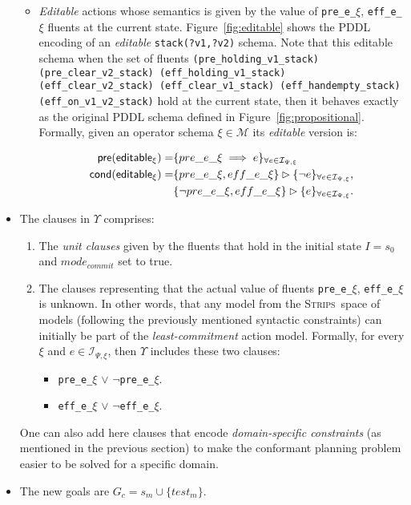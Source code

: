 \documentclass{article}
\newcommand{\pre}{\mathsf{pre}}     %
\newcommand{\cond}{\mathsf{cond}}   %
\newcommand{\strips}{\textsc{Strips}}
\begin{document}
\begin{itemize}
\begin{itemize}
      \item {\em Editable} actions whose semantics is given by the value of {\tt\small pre\_e\_$\xi$}, {\tt\small eff\_e\_$\xi$} fluents at the current state. Figure~\ref{fig:editable} shows the PDDL encoding of an {\em editable} {\tt\small stack(?v1,?v2)} schema. Note that this editable schema when the set of fluents {\tiny\tt (pre\_holding\_v1\_stack) (pre\_clear\_v2\_stack) (eff\_holding\_v1\_stack) (eff\_clear\_v2\_stack) (eff\_clear\_v1\_stack) (eff\_handempty\_stack) (eff\_on\_v1\_v2\_stack)} hold at the current state, then it behaves exactly as the original PDDL schema defined in Figure~\ref{fig:propositional}. Formally, given an operator schema $\xi\in\mathcal{M}$ its {\em editable} version is:
\begin{small}  
\begin{align*}
\hspace*{7pt}\pre(\mathsf{editable_{\xi}})=&\{pre\_e\_\xi\implies e\}_{\forall e\in{\mathcal I}_{\Psi,\xi}}\\
\cond(\mathsf{editable_{\xi}})=&\{pre\_e\_\xi, eff\_e\_\xi\}\rhd\{\neg e\}_{\forall e\in{\mathcal I}_{\Psi,\xi}},\\
&\{\neg pre\_e\_\xi, eff\_e\_\xi\}\rhd\{e\}_{\forall e\in{\mathcal I}_{\Psi,\xi}}.
\end{align*}
\end{small}

\end{itemize}

\item The clauses in $\Upsilon$ comprises:
      \begin{enumerate}
      \item The {\em unit clauses} given by the fluents that hold in the initial state $I=s_0$ and $mode_{commit}$ set to true.
      \item The clauses representing that the actual value of fluents {\tt\small pre\_e\_$\xi$}, {\tt\small eff\_e\_$\xi$} is unknown. In other words, that any model from the \strips\ space of models (following the previously mentioned syntactic constraints) can initially be part of the {\em least-commitment} action model. Formally, for every $\xi$ and $e\in{\mathcal I}_{\Psi,\xi}$, then $\Upsilon$ includes these two clauses:
            \begin{itemize}
            \item {\tt\small pre\_e\_$\xi$} $\vee$ {\tt\small $\neg$pre\_e\_$\xi$}.
            \item {\tt\small eff\_e\_$\xi$} $\vee$ {\tt\small $\neg$eff\_e\_$\xi$}.
            \end{itemize}
      \end{enumerate}
One can also add here clauses that encode {\em domain-specific constraints} (as mentioned in the previous section) to make the conformant planning problem easier to be solved for a specific domain. 
\item The new goals are $G_c=s_m\cup\{test_m\}$.
\end{itemize}
\end{document}

